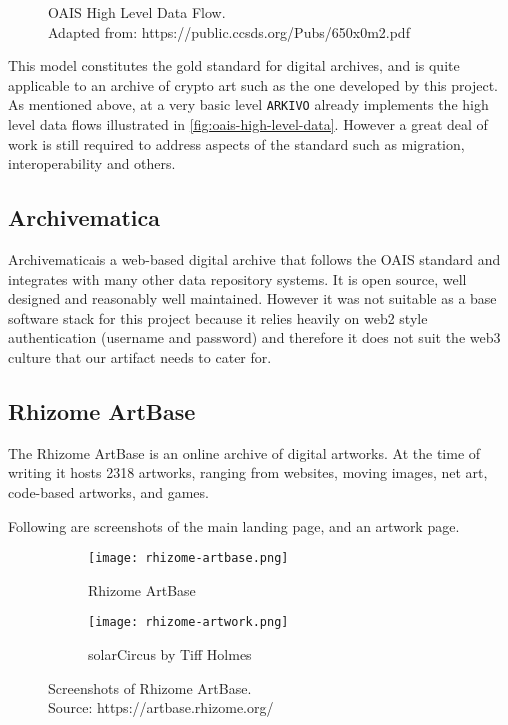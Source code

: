 \begin{figure}[h]
    \centering
    \captionsetup{justification=centering}
    
    \caption[OAIS High Level Data Flow]{OAIS High Level Data Flow. \\ Adapted from: https://public.ccsds.org/Pubs/650x0m2.pdf}
    \label{fig:oais-high-level-data}
\end{figure}

This model constitutes the gold standard for digital archives, and is quite applicable to an archive of crypto art such as the one developed by this project. As mentioned above, at a very basic level \texttt{ARKIVO} already implements the high level data flows illustrated in \autoref{fig:oais-high-level-data}. However a great deal of work is still required to address aspects of the standard such as migration, interoperability and others.

\subsection{Archivematica}

Archivematica\footnotemark[8] is a web-based digital archive that follows the OAIS standard and integrates with many other data repository systems. It is open source, well designed and reasonably well maintained. However it was not suitable as a base software stack for this project because it relies heavily on web2 style authentication (username and password) and therefore it does not suit the web3 culture that our artifact needs to cater for.


\subsection{Rhizome ArtBase}

The Rhizome ArtBase is an online archive of digital artworks. At the time of writing it hosts 2318 artworks, ranging from websites, moving images, net art, code-based artworks, and games.

Following are screenshots of the main landing page, and an artwork page.


\begin{figure}[H]
  \centering
  \captionsetup{justification=centering}
  \begin{subfigure}[b]{0.45\textwidth}
    \centering
    \texttt{[image: rhizome-artbase.png]}
    \caption{Rhizome ArtBase}
    \label{fig:image1}
  \end{subfigure}
  \hfill
  \begin{subfigure}[b]{0.45\textwidth}
    \centering
    \texttt{[image: rhizome-artwork.png]}
    \caption{solarCircus by Tiff Holmes}
    \label{fig:image2}
  \end{subfigure}
  \caption[Screenshots of Rhizome ArtBase]{Screenshots of Rhizome ArtBase. \\ Source: https://artbase.rhizome.org/}
  \label{fig:rhizome-screens}
\end{figure}


